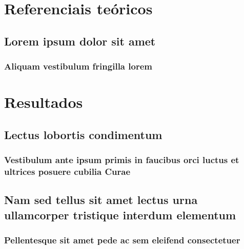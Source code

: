 \documentclass[
	12pt,				%
	openright,			%
	twoside,			%
	a4paper,			%
	english,			%
	french,				%
	spanish,			%
	brazil				%
	]{abntex2}
\begin{document}
\part{Referenciais teóricos}

\chapter{Lorem ipsum dolor sit amet}

\section{Aliquam vestibulum fringilla lorem}

\lipsum[1]

\lipsum[2-3]

\part{Resultados}

\chapter{Lectus lobortis condimentum}

\section{Vestibulum ante ipsum primis in faucibus orci luctus et ultrices
posuere cubilia Curae}

\lipsum[21-22]

\chapter{Nam sed tellus sit amet lectus urna ullamcorper tristique interdum
elementum}

\section{Pellentesque sit amet pede ac sem eleifend consectetuer}
\end{document}
